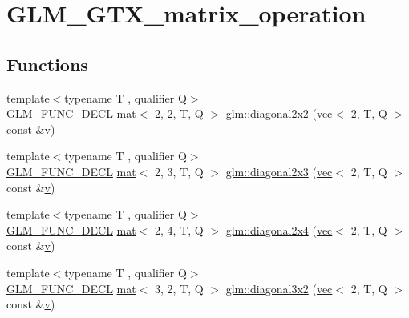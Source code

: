 \hypertarget{group__gtx__matrix__operation}{}\section{G\+L\+M\+\_\+\+G\+T\+X\+\_\+matrix\+\_\+operation}
\label{group__gtx__matrix__operation}
\subsection*{Functions}
\begin{DoxyCompactItemize}
\item 
{\footnotesize template$<$typename T , qualifier Q$>$ }\\\hyperlink{setup_8hpp_ab2d052de21a70539923e9bcbf6e83a51}{G\+L\+M\+\_\+\+F\+U\+N\+C\+\_\+\+D\+E\+CL} \hyperlink{structglm_1_1mat}{mat}$<$ 2, 2, T, Q $>$ \hyperlink{group__gtx__matrix__operation_ga58a32a2beeb2478dae2a721368cdd4ac}{glm\+::diagonal2x2} (\hyperlink{structglm_1_1vec}{vec}$<$ 2, T, Q $>$ const \&\hyperlink{_s_d_l__opengl_8h_a10a82eabcb59d2fcd74acee063775f90}{v})
\item 
{\footnotesize template$<$typename T , qualifier Q$>$ }\\\hyperlink{setup_8hpp_ab2d052de21a70539923e9bcbf6e83a51}{G\+L\+M\+\_\+\+F\+U\+N\+C\+\_\+\+D\+E\+CL} \hyperlink{structglm_1_1mat}{mat}$<$ 2, 3, T, Q $>$ \hyperlink{group__gtx__matrix__operation_gab69f900206a430e2875a5a073851e175}{glm\+::diagonal2x3} (\hyperlink{structglm_1_1vec}{vec}$<$ 2, T, Q $>$ const \&\hyperlink{_s_d_l__opengl_8h_a10a82eabcb59d2fcd74acee063775f90}{v})
\item 
{\footnotesize template$<$typename T , qualifier Q$>$ }\\\hyperlink{setup_8hpp_ab2d052de21a70539923e9bcbf6e83a51}{G\+L\+M\+\_\+\+F\+U\+N\+C\+\_\+\+D\+E\+CL} \hyperlink{structglm_1_1mat}{mat}$<$ 2, 4, T, Q $>$ \hyperlink{group__gtx__matrix__operation_ga30b4dbfed60a919d66acc8a63bcdc549}{glm\+::diagonal2x4} (\hyperlink{structglm_1_1vec}{vec}$<$ 2, T, Q $>$ const \&\hyperlink{_s_d_l__opengl_8h_a10a82eabcb59d2fcd74acee063775f90}{v})
\item 
{\footnotesize template$<$typename T , qualifier Q$>$ }\\\hyperlink{setup_8hpp_ab2d052de21a70539923e9bcbf6e83a51}{G\+L\+M\+\_\+\+F\+U\+N\+C\+\_\+\+D\+E\+CL} \hyperlink{structglm_1_1mat}{mat}$<$ 3, 2, T, Q $>$ \hyperlink{group__gtx__matrix__operation_ga832c805d5130d28ad76236958d15b47d}{glm\+::diagonal3x2} (\hyperlink{structglm_1_1vec}{vec}$<$ 2, T, Q $>$ const \&\hyperlink{_s_d_l__opengl_8h_a10a82eabcb59d2fcd74acee063775f90}{v})

\end{DoxyCompactItemize}
